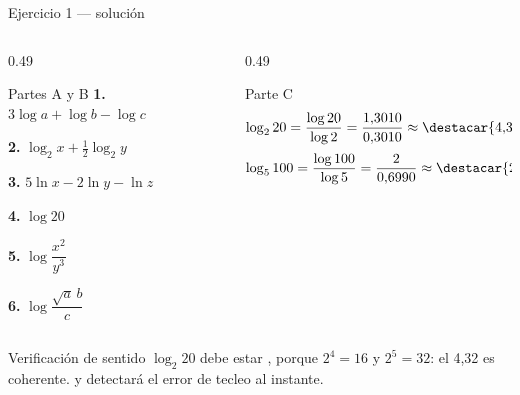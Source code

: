\documentclass[aspectratio=169,10pt]{beamer}
\begin{document}
\begin{frame}{Ejercicio 1 — solución}
  \scriptsize
  \begin{columns}[T,onlytextwidth]
    \begin{column}{0.49\textwidth}
      \begin{block}{Partes A y B}
        \tiny
        \textbf{1.} $3\log a + \log b - \log c$

        \textbf{2.} $\log_{2}x + \tfrac{1}{2}\log_{2}y$

        \textbf{3.} $5\ln x - 2\ln y - \ln z$

        \vspace{0.08cm}
        \textbf{4.} $\log 20$

        \textbf{5.} $\log\dfrac{x^{2}}{y^{3}}$

        \textbf{6.} $\log\dfrac{\sqrt{a}\,b}{c}$
      \end{block}
    \end{column}
    \begin{column}{0.49\textwidth}
      \begin{exampleblock}{Parte C}
        \tiny
        \[ \log_{2}20 = \frac{\log 20}{\log 2}
           = \frac{1{,}3010}{0{,}3010} \approx \destacar{4{,}32} \]
        \[ \log_{5}100 = \frac{\log 100}{\log 5}
           = \frac{2}{0{,}6990} \approx \destacar{2{,}86} \]
      \end{exampleblock}
    \end{column}
  \end{columns}

  \vspace{0.08cm}
  \begin{alertblock}{Verificación de sentido}
    \tiny
    $\log_{2}20$ debe estar , porque $2^4=16$ y $2^5=32$:
    el 4,32 es coherente.  y detectará el error
    de tecleo al instante.
  \end{alertblock}
\end{frame}
\end{document}

